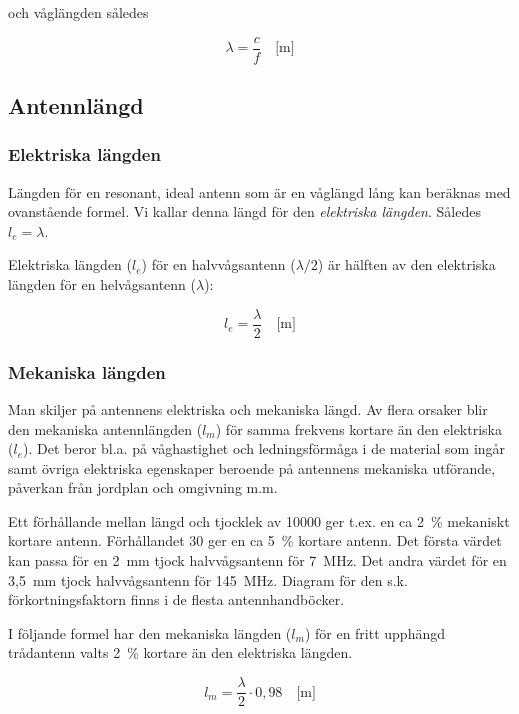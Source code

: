 och våglängden således

\[ \lambda = \frac{c}{f} \quad \text{[m]} \]

\subsection{Antennlängd}

\subsubsection{Elektriska längden}

Längden för en resonant, ideal antenn som är en våglängd lång kan beräknas med
ovanstående formel.
Vi kallar denna längd för den \emph{elektriska längden}.
Således \(l_e = \lambda\).

Elektriska längden (\(l_e\)) för en halvvågsantenn (\(\lambda/2\)) är hälften
av den elektriska längden för en helvågsantenn (\(\lambda\)):

\[l_e = \frac{\lambda}{2} \quad \text{[m]}\]

\subsubsection{Mekaniska längden}

Man skiljer på antennens elektriska och mekaniska längd.
Av flera orsaker blir den mekaniska antennlängden (\(l_m\)) för samma
frekvens kortare än den elektriska (\(l_e\)).
Det beror bl.a. på våghastighet och ledningsförmåga i de material som ingår
samt övriga elektriska egenskaper beroende på antennens mekaniska utförande,
påverkan från jordplan och omgivning m.m.

Ett förhållande mellan längd och tjocklek av 10000 ger t.ex. en ca 2~\%
mekaniskt kortare antenn.
Förhållandet 30 ger en ca 5~\% kortare antenn.
Det första värdet kan passa för en 2~mm tjock halvvågsantenn för 7~MHz.
Det andra värdet för en 3,5~mm tjock halvvågsantenn för 145~MHz.
Diagram för den s.k. förkortningsfaktorn finns i de flesta antennhandböcker.

I följande formel har den mekaniska längden (\(l_m\)) för en fritt upphängd
trådantenn valts 2~\% kortare än den elektriska längden.

\[l_m = \frac{\lambda}{2} \cdot 0,98 \quad \text{[m]}\]

